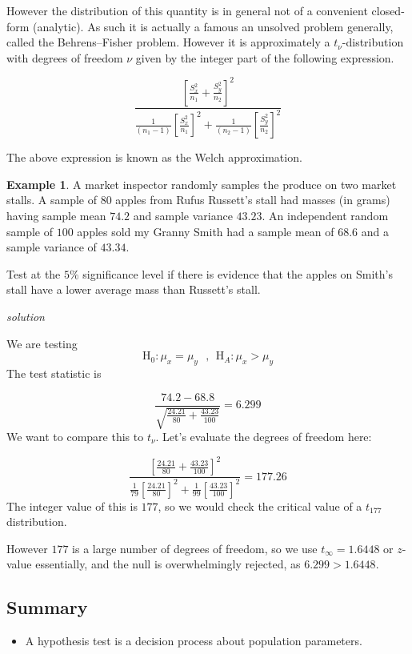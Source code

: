 \documentclass[
]{book}
\providecommand{\tightlist}{%
  \setlength{\itemsep}{0pt}\setlength{\parskip}{0pt}}
\theoremstyle{definition}
\theoremstyle{definition}
\newtheorem{example}{Example}[chapter]
\theoremstyle{definition}
\theoremstyle{definition}
\theoremstyle{remark}
\begin{document}
However the distribution of this quantity is in general not of a convenient closed-form (analytic). As such it is actually a famous an unsolved problem generally, called the Behrens--Fisher problem. However it is approximately a \(t_\nu\)-distribution with degrees of freedom \(\nu\) given by the integer part of the following expression.

\[\frac{\left[\frac{S^2_x}{n_1}+\frac{S^2_y}{n_2} \right]^2}{\frac{1}{(n_1-1)}\left[\frac{S_x^2}{n_1}\right]^2+\frac{1}{(n_2-1)}\left[\frac{S_y^2}{n_2}\right]^2} \]

The above expression is known as the Welch approximation.

\begin{example}
A market inspector randomly samples the produce on two market stalls. A sample of \(80\) apples from Rufus Russett's stall had masses (in grams) having sample mean \(74.2\) and sample variance \(43.23\).
An independent random sample of \(100\) apples sold my Granny Smith had a sample mean of \(68.6\) and a sample variance of \(43.34\).

Test at the \(5\%\) significance level if there is evidence that the apples on Smith's stall have a lower average mass than Russett's stall.
\end{example}

\emph{solution}

We are testing
\[\text{H}_0: \mu_x = \mu_y \ \ \ , \ \ \text{H}_A:\mu_x>\mu_y\]
The test statistic is

\[ \frac{74.2 - 68.8}{\sqrt{\frac{24.21}{80}+\frac{43.23}{100}}} = 6.299\]
We want to compare this to \(t_\nu\). Let's evaluate the degrees of freedom here:

\[\frac{\left[\frac{24.21}{80}+\frac{43.23}{100} \right]^2}{\frac{1}{79}\left[\frac{24.21}{80}\right]^2+\frac{1}{99}\left[\frac{43.23}{100}\right]^2} = 177.26 \]
The integer value of this is \(177\), so we would check the critical value of a \(t_177\) distribution.

However \(177\) is a large number of degrees of freedom, so we use \(t_{\infty}=1.6448\) or \(z\)-value essentially, and the null is overwhelmingly rejected, as \(6.299 >1.6448\).

\hypertarget{summary-1}{%
\subsection{Summary}\label{summary-1}}

\begin{itemize}
\tightlist
\item
  A hypothesis test is a decision process about population parameters.
\end{itemize}
\end{document}
